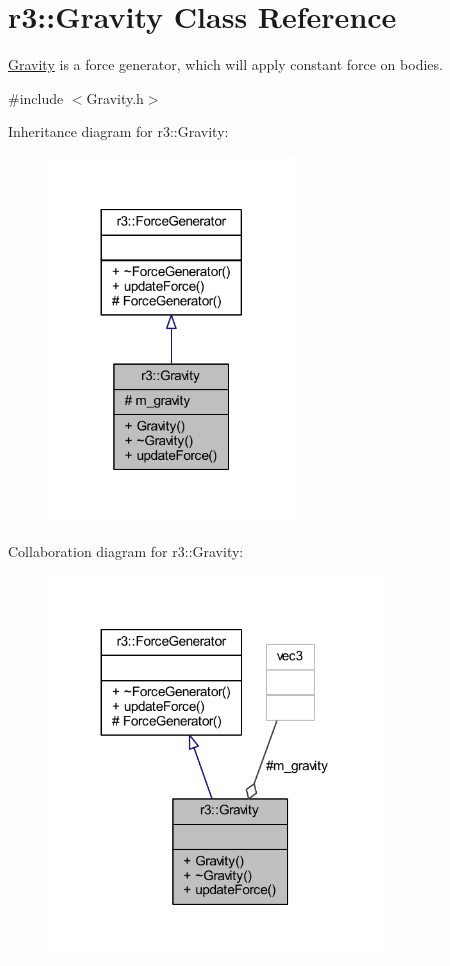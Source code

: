 \hypertarget{classr3_1_1_gravity}{}\section{r3\+:\+:Gravity Class Reference}
\label{classr3_1_1_gravity}


\mbox{\hyperlink{classr3_1_1_gravity}{Gravity}} is a force generator, which will apply constant force on bodies.  




{\ttfamily \#include $<$Gravity.\+h$>$}



Inheritance diagram for r3\+:\+:Gravity\+:\nopagebreak
\begin{figure}[H]
\begin{center}
\leavevmode
\includegraphics[width=185pt]{classr3_1_1_gravity__inherit__graph}
\end{center}
\end{figure}


Collaboration diagram for r3\+:\+:Gravity\+:\nopagebreak
\begin{figure}[H]
\begin{center}
\leavevmode
\includegraphics[width=251pt]{classr3_1_1_gravity__coll__graph}
\end{center}
\end{figure}
